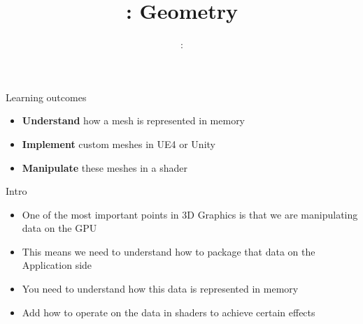 \usepackage{../../beamerthemeFalmouthGamesAcademy}
\usepackage{multimedia}
\graphicspath{ {../../} }


\usepackage[normalem]{ulem}
\usepackage{wasysym}

\usepackage{pdfpages}

\usetikzlibrary{arrows,automata}




\title{\sessionnumber: Geometry}
\subtitle{\modulecode: \moduletitle}

\frame{\titlepage} 

\begin{frame}{Learning outcomes}
	\begin{itemize}
		\item \textbf{Understand} how a mesh is represented in memory
		\item \textbf{Implement} custom meshes in UE4 or Unity
		\item \textbf{Manipulate} these meshes in a shader
	\end{itemize}
\end{frame}

\begin{frame}{Intro}
	\begin{itemize}
		\item One of the most important points in 3D Graphics is that we are manipulating data on the GPU
		\pause\item This means we need to understand how to package that data on the Application side
		\pause\item You need to understand how this data is represented in memory
		\pause\item Add how to operate on the data in shaders to achieve certain effects
	\end{itemize}
\end{frame}











